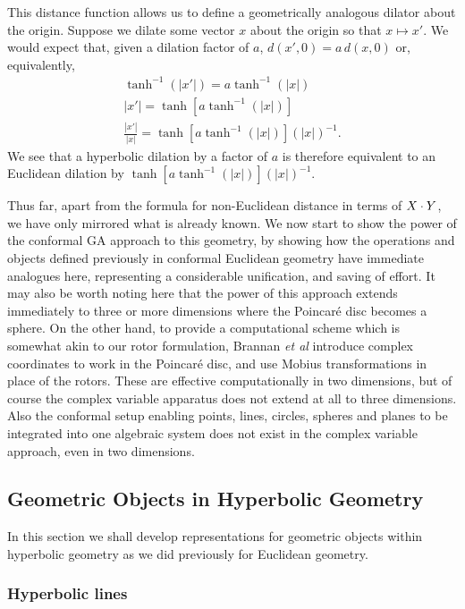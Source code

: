 This distance function allows us to define a geometrically analogous
dilator about the origin. Suppose we dilate some vector $x$ about the
origin so that $x \mapsto x'$. We would expect that, given a dilation
factor of $a$, $d(x',0) = a\,d(x,0)$ or, equivalently,
\begin{eqnarray*}
\tanh^{-1}(|x'|) = a \tanh^{-1}(|x|) \\
|x'| = \tanh[ a \tanh^{-1}(|x|) ] \\
\frac{|x'|}{|x|} = {\tanh[ a \tanh^{-1}(|x|) ]}({|x|})^{-1}.
\end{eqnarray*}
We see that a hyperbolic dilation by a factor of $a$ is therefore
equivalent to an Euclidean dilation by ${\tanh[ a \tanh^{-1}(|x|) ]}({|x|})^{-1}$.

Thus far, apart from the formula for non-Euclidean
distance in terms of $X \cdot Y$, we have only mirrored
what is already known. We now start to show the power of
the conformal GA approach to this geometry, by showing
how the operations and objects defined previously in
conformal Euclidean geometry have immediate analogues
here, representing a considerable unification, and saving
of effort. It may also be worth noting here that the
power of this approach extends immediately to three or more
dimensions where the Poincar\'e
disc becomes a sphere. On the other hand, to provide a
computational scheme which is somewhat akin to our rotor
formulation, Brannan \emph{et al} \cite{GEOM:Brannan} introduce complex coordinates
to work in the Poincar\'e disc, and use Mobius
transformations in place of the rotors. These are
effective computationally in two dimensions, but of course the
complex variable apparatus does not extend at all to three dimensions.
Also the
conformal setup enabling points, lines, circles, spheres
and planes to be integrated into one algebraic system
does not exist in the complex variable approach, even in
two dimensions.

\subsection{Geometric Objects in Hyperbolic Geometry}

In this section we shall develop representations for geometric objects
within hyperbolic geometry as we did previously for Euclidean geometry.

\subsubsection{Hyperbolic lines}

